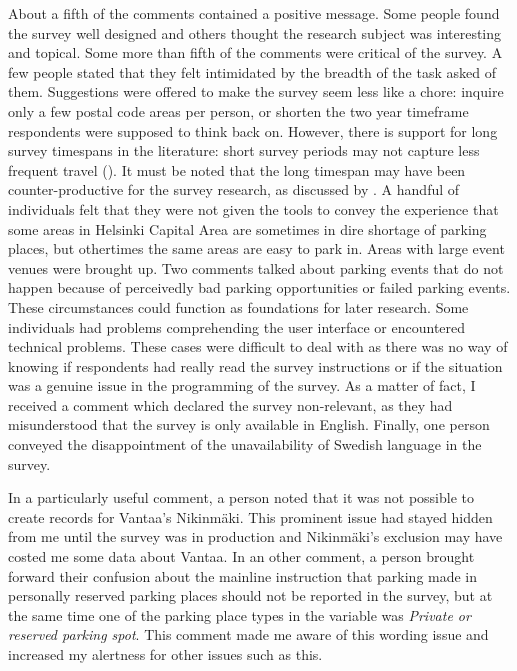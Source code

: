 About a fifth of the comments contained a positive message. Some people found the survey well designed and others thought the research subject was interesting and topical. Some more than fifth of the comments were critical of the survey. A few people stated that they felt intimidated by the breadth of the task asked of them. Suggestions were offered to make the survey seem less like a chore: inquire only a few postal code areas per person, or shorten the two year timeframe respondents were supposed to think back on. However, there is support for long survey timespans in the literature: short survey periods may not capture less frequent travel (\cite{Mokhtarian2004}). It must be noted that the long timespan may have been counter-productive for the survey research, as discussed by . A handful of individuals felt that they were not given the tools to convey the experience that some areas in Helsinki Capital Area are sometimes in dire shortage of parking places, but othertimes the same areas are easy to park in. Areas with large event venues were brought up. Two comments talked about parking events that do not happen because of perceivedly bad parking opportunities or failed parking events. These circumstances could function as foundations for later research. Some individuals had problems comprehending the user interface or encountered technical problems. These cases were difficult to deal with as there was no way of knowing if respondents had really read the survey instructions or if the situation was a genuine issue in the programming of the survey. As a matter of fact, I received a comment which declared the survey non-relevant, as they had misunderstood that the survey is only available in English. Finally, one person conveyed the disappointment of the unavailability of Swedish language in the survey.

In a particularly useful comment, a person noted that it was not possible to create records for Vantaa's Nikinmäki. This prominent issue had stayed hidden from me until the survey was in production and Nikinmäki's exclusion may have costed me some data about Vantaa. In an other comment, a person brought forward their confusion about the mainline instruction that parking made in personally reserved parking places should not be reported in the survey, but at the same time one of the parking place types in the variable  was \textit{Private or reserved parking spot}. This comment made me aware of this wording issue and increased my alertness for other issues such as this.


